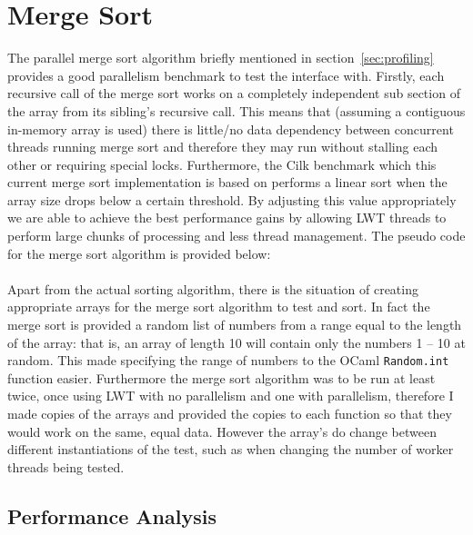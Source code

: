 \documentclass[12pt,twoside,notitlepage]{report}
\begin{document}
\section{Merge Sort}
\label{sec:merge_sort}
The parallel merge sort algorithm briefly mentioned in section~\ref{sec:profiling} provides a good parallelism benchmark to test the interface with. Firstly, each recursive call of the merge sort works on a completely independent sub
section of the array from its sibling's recursive call. This means that (assuming a contiguous in-memory array is used) there is little/no data dependency between concurrent threads running merge sort
and therefore they may run without stalling each other or requiring special locks. Furthermore, the Cilk benchmark which this current merge sort implementation is based on performs a linear sort when the array size drops below a
certain threshold. By adjusting this value appropriately we are able to achieve the best performance gains by allowing LWT threads to perform large chunks of processing and less thread management. The pseudo code for the merge sort
algorithm is provided below:
\hfill\\
\hfill\\
Apart from the actual sorting algorithm, there is the situation of creating appropriate arrays for the merge sort algorithm to test and sort. In fact the merge sort is provided a random list of numbers from a range equal to the length
of the array: that is, an array of length 10 will contain only the numbers 1 -- 10 at random. This made specifying the range of numbers to the OCaml {\tt Random.int} function easier. Furthermore the merge sort algorithm was to
be run at least twice, once using LWT with no parallelism and one with parallelism, therefore I made copies of the arrays and provided the copies to each function so that they would work on the same, equal data. However the array's
do change between different instantiations of the test, such as when changing the number of worker threads being tested.

\subsection{Performance Analysis}
\end{document}
